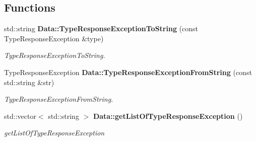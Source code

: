 \subsection*{Functions}
\begin{DoxyCompactItemize}
\item 
std\+::string \textbf{ Data\+::\+Type\+Response\+Exception\+To\+String} (const Type\+Response\+Exception \&type)
\begin{DoxyCompactList}\small\item\em Type\+Response\+Exception\+To\+String. \end{DoxyCompactList}\item 
Type\+Response\+Exception \textbf{ Data\+::\+Type\+Response\+Exception\+From\+String} (const std\+::string \&str)
\begin{DoxyCompactList}\small\item\em Type\+Response\+Exception\+From\+String. \end{DoxyCompactList}\item 
std\+::vector$<$ std\+::string $>$ \textbf{ Data\+::get\+List\+Of\+Type\+Response\+Exception} ()
\begin{DoxyCompactList}\small\item\em get\+List\+Of\+Type\+Response\+Exception \end{DoxyCompactList}\end{DoxyCompactItemize}
